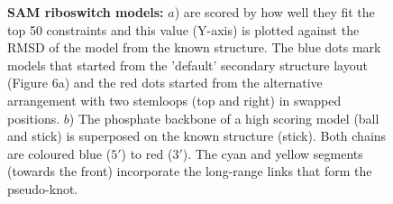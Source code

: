 \begin{figure}
\centering
{}
\caption{
\label{Fig:ribo}
{\bf SAM riboswitch models:} $a$) are scored by how well they fit the top 50 constraints
and this value (Y-axis) is plotted against the RMSD of the model from the known structure.
The blue dots mark models that started from the 'default' secondary structure layout
(Figure 6a) and the red dots started from the alternative arrangement with two stemloops
(top and right) in swapped positions.
$b$) The phosphate backbone of a high scoring model (ball and stick) is superposed on the 
known structure (stick).  Both chains are coloured blue ($5'$) to red ($3'$).
The cyan and yellow segments (towards the front) incorporate the long-range links that
form the pseudo-knot.
}
\end{figure}
